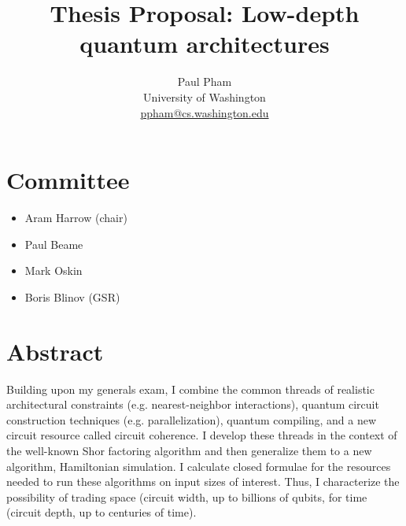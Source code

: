 \documentclass[]{article}
\newcommand{\email}[1]{\href{mailto:#1}{#1}}
\theoremstyle{plain} \newtheorem{lemma}{Lemma}
\begin{document}

\title{Thesis Proposal: Low-depth quantum architectures}


%
%
\author{Paul Pham\\
University of Washington\\
\email{ppham@cs.washington.edu}
}

\maketitle

\section{Committee}

\begin{itemize}
\item Aram Harrow (chair)
\item Paul Beame
\item Mark Oskin
\item Boris Blinov (GSR)
\end{itemize}

\section{Abstract}

Building upon my generals exam, I combine the common threads of
realistic architectural constraints (e.g. nearest-neighbor
interactions),
quantum circuit construction techniques (e.g. parallelization),
quantum compiling, and
a new circuit resource called circuit coherence. I develop these threads
in the context of
the well-known Shor factoring algorithm and then generalize them to
a new algorithm, Hamiltonian simulation. I calculate closed formulae
for the resources needed
to run these algorithms on input sizes of interest. Thus, I characterize the
possibility of trading space (circuit width, up to billions of
qubits, for time (circuit depth, up to centuries of time).
\end{document}
